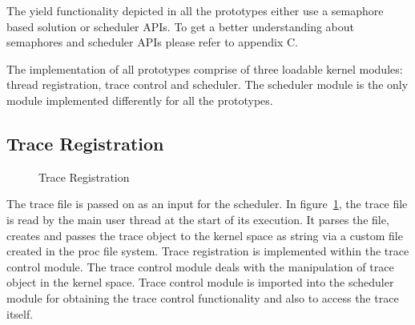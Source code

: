 The yield functionality depicted in all the prototypes either use a semaphore based solution or scheduler APIs. To get a better understanding about semaphores and scheduler APIs please refer to appendix C.

The implementation of all prototypes comprise of three loadable kernel modules: thread registration, trace control and scheduler. 
The scheduler module is the only module implemented differently for all the prototypes.

\subsection{Trace Registration}

\begin{figure}[h]
\centering
{}
\caption{Trace Registration}
\label{trace_reg}
\end{figure}
The trace file is passed on as an input for the scheduler. 
In figure~\ref{trace_reg}, the trace file is read by the main user thread at the start of its execution. 
It parses the file, creates and passes the trace object to the kernel space as string via a custom file created in the proc file system. 
Trace registration is implemented within the trace control module. 
The trace control module deals with the manipulation of trace object in the kernel space. 
Trace control module is imported into the scheduler module for obtaining the trace control functionality and also to access the trace itself. 
